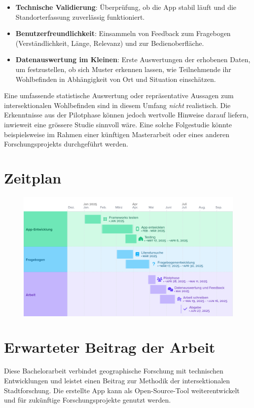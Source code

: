 \documentclass{template}
\begin{document}
\begin{itemize}
    \item \textbf{Technische Validierung}: Überprüfung, ob die App stabil läuft und die Standorterfassung zuverlässig funktioniert.
    \item \textbf{Benutzerfreundlichkeit}: Einsammeln von Feedback zum Fragebogen (Verständlichkeit, Länge, Relevanz) und zur Bedienoberfläche.
    \item \textbf{Datenauswertung im Kleinen}: Erste Auswertungen der erhobenen Daten, um festzustellen, ob sich Muster erkennen lassen, wie Teilnehmende ihr Wohlbefinden in Abhängigkeit von Ort und Situation einschätzen.
\end{itemize}

Eine umfassende statistische Auswertung oder repräsentative Aussagen zum intersektionalen Wohlbefinden sind in diesem Umfang \textit{nicht} realistisch. Die Erkenntnisse aus der Pilotphase können jedoch wertvolle Hinweise darauf liefern, inwieweit eine grössere Studie sinnvoll wäre. Eine solche Folgestudie könnte beispielsweise im Rahmen einer künftigen Masterarbeit oder eines anderen Forschungsprojekts durchgeführt werden.





\section{Zeitplan}

\begin{figure}[h]
    \centering
    \includegraphics[width=1\linewidth]{timeline_proposal.png}
\end{figure}


\section{Erwarteter Beitrag der Arbeit}
Diese Bachelorarbeit verbindet geographische Forschung mit technischen Entwicklungen und leistet einen Beitrag zur Methodik der intersektionalen Stadtforschung. Die erstellte App kann als Open-Source-Tool weiterentwickelt und für zukünftige Forschungsprojekte genutzt werden.
\end{document}
